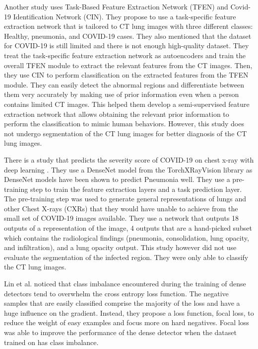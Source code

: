 Another study \cite{ref6} uses Task-Based Feature Extraction Network (TFEN) and Covid-19 Identification Network (CIN).  They propose to use a task-specific feature extraction network that is tailored to CT lung images with three different classes: Healthy, pneumonia, and COVID-19 cases. They also mentioned that the dataset for COVID-19 is still limited and there is not enough high-quality dataset. They treat the task-specific feature extraction network as autoencoders and train the overall TFEN module to extract the relevant features from the CT images. Then, they use CIN to perform classification on the extracted features from the TFEN module. They can easily detect the abnormal regions and differentiate between them very accurately by making use of prior information even when a person contains limited CT images. This helped them develop a semi-supervised feature extraction network that allows obtaining the relevant prior information to perform the classification to mimic human behaviors. However, this study does not undergo segmentation of the CT lung images for better diagnosis of the CT lung images.

There is a study that predicts the severity score of COVID-19 on chest x-ray with deep learning \cite{ref7}. They use a DenseNet model from the TorchXRayVision library as DenseNet models have been shown to predict Pneumonia well. They use a pre-training step to train the feature extraction layers and a task prediction layer. The pre-training step was used to generate general representations of lungs and other Chest X-rays (CXRs) that they would have unable to achieve from the small set of COVID-19 images available. They use a network that outputs 18 outputs of a representation of the image, 4 outputs that are a hand-picked subset which contains the radiological findings (pneumonia, consolidation, lung opacity, and infiltration), and a lung opacity output. This study however did not use evaluate the segmentation of the infected region. They were only able to classify the CT lung images.

Lin et al. \cite{ref8} noticed that class imbalance encountered during the training of dense detectors tend to overwhelm the cross entropy loss function. The negative samples that are easily classified comprise the majority of the loss and have a huge influence on the gradient. Instead, they propose a loss function, focal loss, to reduce the weight of easy examples and focus more on hard negatives. Focal loss was able to improve the performance of the dense detector when the dataset trained on has class imbalance. 

